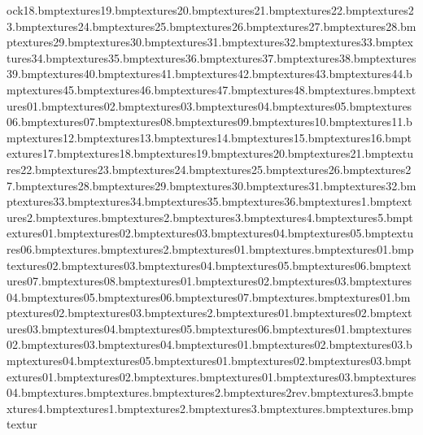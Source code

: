 ock18.bmp textures\sharprock19.bmp textures\sharprock20.bmp textures\sharprock21.bmp textures\sharprock22.bmp textures\sharprock23.bmp textures\sharprock24.bmp textures\sharprock25.bmp textures\sharprock26.bmp textures\sharprock27.bmp textures\sharprock28.bmp textures\sharprock29.bmp textures\sharprock30.bmp textures\sharprock31.bmp textures\sharprock32.bmp textures\sharprock33.bmp textures\sharprock34.bmp textures\sharprock35.bmp textures\sharprock36.bmp textures\sharprock37.bmp textures\sharprock38.bmp textures\sharprock39.bmp textures\sharprock40.bmp textures\sharprock41.bmp textures\sharprock42.bmp textures\sharprock43.bmp textures\sharprock44.bmp textures\sharprock45.bmp textures\sharprock46.bmp textures\sharprock47.bmp textures\sharprock48.bmp textures\sign.bmp textures\sign01.bmp textures\sign02.bmp textures\sign03.bmp textures\sign04.bmp textures\sign05.bmp textures\sign06.bmp textures\sign07.bmp textures\sign08.bmp textures\sign09.bmp textures\sign10.bmp textures\sign11.bmp textures\sign12.bmp textures\sign13.bmp textures\sign14.bmp textures\sign15.bmp textures\sign16.bmp textures\sign17.bmp textures\sign18.bmp textures\sign19.bmp textures\sign20.bmp textures\sign21.bmp textures\sign22.bmp textures\sign23.bmp textures\sign24.bmp textures\sign25.bmp textures\sign26.bmp textures\sign27.bmp textures\sign28.bmp textures\sign29.bmp textures\sign30.bmp textures\sign31.bmp textures\sign32.bmp textures\sign33.bmp textures\sign34.bmp textures\sign35.bmp textures\sign36.bmp textures\simplewall1.bmp textures\simplewall2.bmp textures\simplewallextra.bmp textures\simplewallextra2.bmp textures\simplewallextra3.bmp textures\simplewallextra4.bmp textures\simplewallextra5.bmp textures\slide01.bmp textures\slide02.bmp textures\slide03.bmp textures\slide04.bmp textures\slide05.bmp textures\slide06.bmp textures\snow.bmp textures\snow2.bmp textures\snowbarber01.bmp textures\snowblanket.bmp textures\snowdecal01.bmp textures\snowdecal02.bmp textures\snowdecal03.bmp textures\snowdecal04.bmp textures\snowdecal05.bmp textures\snowdecal06.bmp textures\snowdecal07.bmp textures\snowdecal08.bmp textures\snowplank01.bmp textures\snowplank02.bmp textures\snowplank03.bmp textures\snowplank04.bmp textures\snowplank05.bmp textures\snowplank06.bmp textures\snowplank07.bmp textures\snowpole.bmp textures\snowpole01.bmp textures\snowpole02.bmp textures\snowpole03.bmp textures\snowpole2.bmp textures\snowtograss01.bmp textures\snowtograss02.bmp textures\snowtograss03.bmp textures\snowtograss04.bmp textures\snowtograss05.bmp textures\snowtograss06.bmp textures\snowtograsscorner01.bmp textures\snowtograsscorner02.bmp textures\snowtograsscorner03.bmp textures\snowtograsscorner04.bmp textures\snowtopath01.bmp textures\snowtopath02.bmp textures\snowtopath03.bmp textures\snowtopath04.bmp textures\snowtopath05.bmp textures\snowtopathcorner01.bmp textures\snowtopathcorner02.bmp textures\snowtopathcorner03.bmp textures\snowtopathdecal01.bmp textures\snowtopathdecal02.bmp textures\snowtree.bmp textures\snowtree01.bmp textures\snowtree03.bmp textures\snowtree04.bmp textures\strawfloor.bmp textures\tazsign.bmp textures\tazsign2.bmp textures\tazsign2rev.bmp textures\tazsign3.bmp textures\tazsign4.bmp textures\templevines1.bmp textures\templevines2.bmp textures\templevines3.bmp textures\test.bmp textures\torch.bmp textur